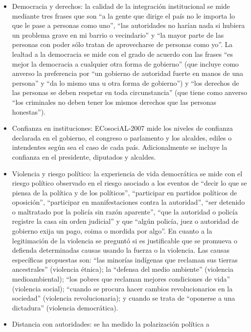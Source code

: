 \documentclass[
  12pt,
]{book}
\begin{document}
\begin{itemize}
\item
  Democracia y derechos: la calidad de la integración institucional se
  mide mediante tres frases que son ``a la gente que dirige el país no
  le importa lo que le pase a personas como uno'', ``las autoridades no
  harían nada si hubiera un problema grave en mi barrio o vecindario''
  y ``la mayor parte de las personas con poder sólo tratan de
  aprovecharse de personas como yo''. La lealtad a la democracia se
  mide con el grado de acuerdo con las frases ``es mejor la democracia
  a cualquier otra forma de gobierno'' (que incluye como anverso la
  preferencia por ``un gobierno de autoridad fuerte en manos de una
  persona'' y ``da lo mismo una u otra forma de gobierno'') y ``los
  derechos de las personas se deben respetar en toda circunstancia''
  (que tiene como anverso ``los criminales no deben tener los mismos
  derechos que las personas honestas'').
\item
  Confianza en instituciones: ECosociAL-2007 mide los niveles de
  confianza declarada en el gobierno, el congreso o parlamento y los
  alcaldes, ediles o intendentes según sea el caso de cada país.
  Adicionalmente se incluye la confianza en el presidente, diputados y
  alcaldes.
\item
  Violencia y riesgo político: la experiencia de vida democrática se
  mide con el riesgo político observado en el riesgo asociado a los
  eventos de ``decir lo que se piensa de la política y de los
  políticos'', ``participar en partidos políticos de oposición'',
  ``participar en manifestaciones contra la autoridad'', ``ser detenido o
  maltratado por la policía sin razón aparente'', ``que la autoridad o
  policía registre la casa sin orden judicial'' y que ``algún policía,
  juez o autoridad de gobierno exija un pago, coima o mordida por
  algo''. En cuanto a la legitimación de la violencia se preguntó si es
  justificable que se promueva o defienda determinadas causas usando
  la fuerza o la violencia. Las causas específicas propuestas son:
  ``las minorías indígenas que reclaman sus tierras ancestrales''
  (violencia étnica); la ``defensa del medio ambiente'' (violencia
  medioambiental); ``los pobres que reclaman mejores condiciones de
  vida'' (violencia social); ``cuando se procura hacer cambios
  revolucionarios en la sociedad'' (violencia revolucionaria); y cuando
  se trata de ``oponerse a una dictadura'' (violencia democrática).
\item
  Distancia con autoridades: se ha medido la polarización política a

\end{itemize}
\end{document}
